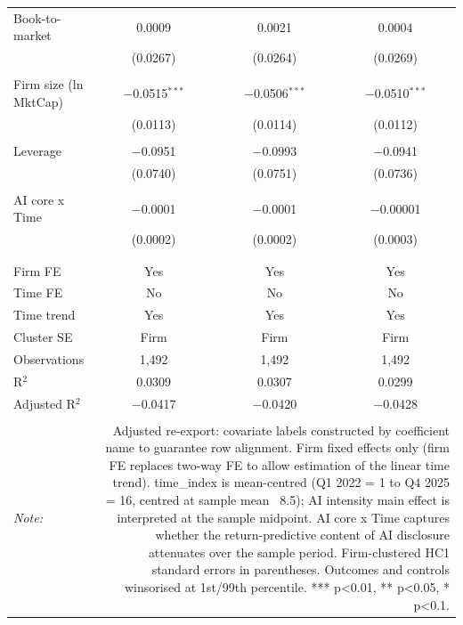 \begin{table}[!htbp]
\begin{tabular}{@{\extracolsep{5pt}}lccc}
 Book-to-market & 0.0009 & 0.0021 & 0.0004 \\ 
  & (0.0267) & (0.0264) & (0.0269) \\ 
  & & & \\ 
 Firm size (ln MktCap) & $-$0.0515$^{***}$ & $-$0.0506$^{***}$ & $-$0.0510$^{***}$ \\ 
  & (0.0113) & (0.0114) & (0.0112) \\ 
  & & & \\ 
 Leverage & $-$0.0951 & $-$0.0993 & $-$0.0941 \\ 
  & (0.0740) & (0.0751) & (0.0736) \\ 
  & & & \\ 
 AI core x Time & $-$0.0001 & $-$0.0001 & $-$0.00001 \\ 
  & (0.0002) & (0.0002) & (0.0003) \\ 
  & & & \\ 
\hline \\[-1.8ex] 
Firm FE & Yes & Yes & Yes \\ 
Time FE & No & No & No \\ 
Time trend & Yes & Yes & Yes \\ 
Cluster SE & Firm & Firm & Firm \\ 
Observations & 1,492 & 1,492 & 1,492 \\ 
R$^{2}$ & 0.0309 & 0.0307 & 0.0299 \\ 
Adjusted R$^{2}$ & $-$0.0417 & $-$0.0420 & $-$0.0428 \\ 
\hline 
\hline \\[-1.8ex] 
\textit{Note:}  & \multicolumn{3}{r}{Adjusted re-export: covariate labels constructed by coefficient name to guarantee row alignment. Firm fixed effects only (firm FE replaces two-way FE to allow estimation of the linear time trend). time_index is mean-centred (Q1 2022 = 1 to Q4 2025 = 16, centred at sample mean ~8.5); AI intensity main effect is interpreted at the sample midpoint. AI core x Time captures whether the return-predictive content of AI disclosure attenuates over the sample period. Firm-clustered HC1 standard errors in parentheses. Outcomes and controls winsorised at 1st/99th percentile. *** p<0.01, ** p<0.05, * p<0.1.} \\ 
\end{tabular} 
\end{table} 
